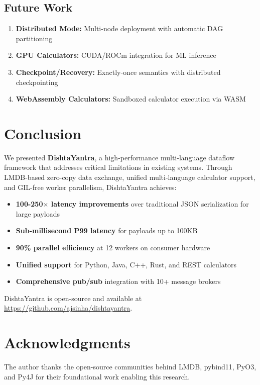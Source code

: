 \documentclass[11pt,a4paper]{article}
\begin{document}
\subsection{Future Work}

\begin{enumerate}
    \item \textbf{Distributed Mode:} Multi-node deployment with automatic DAG partitioning
    \item \textbf{GPU Calculators:} CUDA/ROCm integration for ML inference
    \item \textbf{Checkpoint/Recovery:} Exactly-once semantics with distributed checkpointing
    \item \textbf{WebAssembly Calculators:} Sandboxed calculator execution via WASM
\end{enumerate}

\section{Conclusion}

We presented \textbf{DishtaYantra}, a high-performance multi-language dataflow framework that addresses critical limitations in existing systems. Through LMDB-based zero-copy data exchange, unified multi-language calculator support, and GIL-free worker parallelism, DishtaYantra achieves:

\begin{itemize}
    \item \textbf{100-250$\times$ latency improvements} over traditional JSON serialization for large payloads
    \item \textbf{Sub-millisecond P99 latency} for payloads up to 100KB
    \item \textbf{90\% parallel efficiency} at 12 workers on consumer hardware
    \item \textbf{Unified support} for Python, Java, C++, Rust, and REST calculators
    \item \textbf{Comprehensive pub/sub} integration with 10+ message brokers
\end{itemize}

DishtaYantra is open-source and available at \url{https://github.com/ajsinha/dishtayantra}.

\section*{Acknowledgments}

The author thanks the open-source communities behind LMDB, pybind11, PyO3, and Py4J for their foundational work enabling this research.
\end{document}
